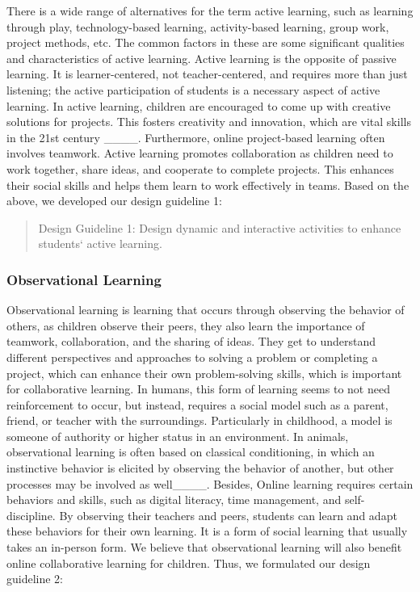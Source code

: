 There is a wide range of alternatives for the term active learning, such as learning through play, technology-based learning, activity-based learning, group work, project methods, etc. The common factors in these are some significant qualities and characteristics of active learning. Active learning is the opposite of passive learning. It is learner-centered, not teacher-centered, and requires more than just listening; the active participation of students is a necessary aspect of active learning. In active learning, children are encouraged to come up with creative solutions for projects. This fosters creativity and innovation, which are vital skills in the 21st century ____. Furthermore, online project-based learning often involves teamwork. Active learning promotes collaboration as children need to work together, share ideas, and cooperate to complete projects. This enhances their social skills and helps them learn to work effectively in teams. Based on the above, we developed our design guideline 1:
\begin{quote}
  Design Guideline 1: Design dynamic and interactive activities to enhance students‘  active learning.
\end{quote}

\subsubsection{Observational Learning}
Observational learning is learning that occurs through observing the behavior of others, as children observe their peers, they also learn the importance of teamwork, collaboration, and the sharing of ideas. They get to understand different perspectives and approaches to solving a problem or completing a project, which can enhance their own problem-solving skills, which is important for collaborative learning.  In humans, this form of learning seems to not need reinforcement to occur, but instead, requires a social model such as a parent, friend, or teacher with the surroundings. Particularly in childhood, a model is someone of authority or higher status in an environment. In animals, observational learning is often based on classical conditioning, in which an instinctive behavior is elicited by observing the behavior of another, but other processes may be involved as 
well____. Besides, Online learning requires certain behaviors and skills, such as digital literacy, time management, and self-discipline. By observing their teachers and peers, students can learn and adapt these behaviors for their own learning. It is a form of social learning that usually takes an in-person form. We believe that observational learning will also benefit online collaborative learning for children. Thus, we formulated our design guideline 2:

